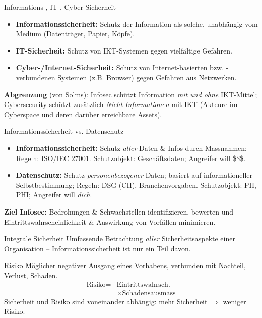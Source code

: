 \documentclass[a4paper, fontsize=7pt]{scrartcl}
\begin{document}
\begin{mainbox}{Informations-, IT-, Cyber-Sicherheit}
\begin{itemize}
    \item \textbf{Informationssicherheit:} Schutz der Information als solche,
          unabhängig vom Medium (Datenträger, Papier, Köpfe).
    \item \textbf{IT-Sicherheit:} Schutz von IKT-Systemen gegen vielfältige Gefahren.
    \item \textbf{Cyber-/Internet-Sicherheit:} Schutz von Internet-basierten bzw.
          -verbundenen Systemen (z.B. Browser) gegen Gefahren aus Netzwerken.
\end{itemize}
\textbf{Abgrenzung} (von Solms): Infosec schützt Information \emph{mit und ohne}
IKT-Mittel; Cybersecurity schützt zusätzlich \emph{Nicht-Informationen} mit IKT
(Akteure im Cyberspace und deren darüber erreichbare Assets).
\end{mainbox}

\begin{mainbox}{Informationssicherheit vs. Datenschutz}
\begin{itemize}
    \item \textbf{Informationssicherheit:} Schutz \emph{aller} Daten \& Infos durch
          Massnahmen; Regeln: ISO/IEC 27001. Schutzobjekt: Geschäftsdaten;
          Angreifer will \$\$\$.
    \item \textbf{Datenschutz:} Schutz \emph{personenbezogener} Daten; basiert auf
          informationeller Selbstbestimmung; Regeln: DSG (CH), Branchenvorgaben.
          Schutzobjekt: PII, PHI; Angreifer will \emph{dich}.
\end{itemize}

\textbf{Ziel Infosec:} Bedrohungen \& Schwachstellen identifizieren, bewerten und
Eintrittswahrscheinlichkeit \& Auswirkung von Vorfällen minimieren.
\end{mainbox}

\begin{subbox}{Integrale Sicherheit}
Umfassende Betrachtung \emph{aller} Sicherheitsaspekte einer Organisation --
Informationssicherheit ist nur ein Teil davon.
\end{subbox}

\begin{mainbox}{Risiko}
Möglicher negativer Ausgang eines Vorhabens, verbunden mit Nachteil, Verlust, Schaden.
$$\boxed{\begin{aligned}\text{Risiko} = {} & \text{Eintrittswahrsch.}\\ & \times \text{Schadensausmass}\end{aligned}}$$
Sicherheit und Risiko sind voneinander abhängig: mehr Sicherheit $\Rightarrow$ weniger
Risiko.
\end{mainbox}
\end{document}
